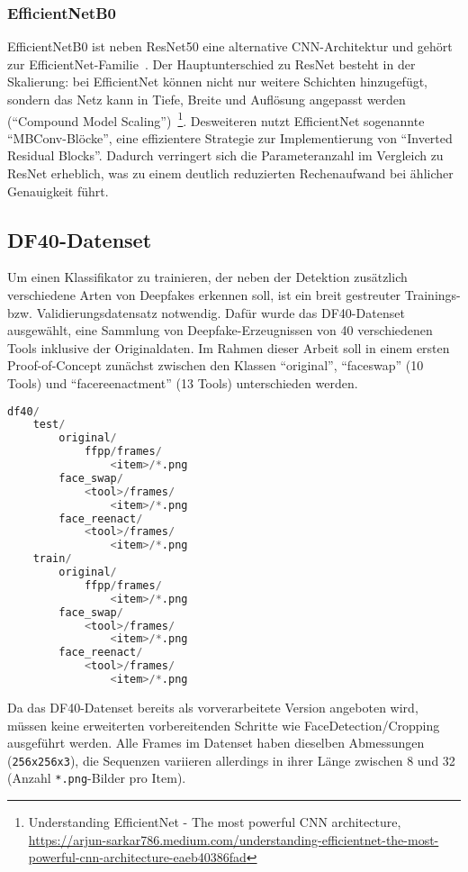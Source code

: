 \documentclass{article}
\begin{document}
    \subsubsection{EfficientNetB0}
    EfficientNetB0 ist neben ResNet50 eine alternative CNN-Architektur und gehört zur EfficientNet-Familie~\cite{efficientnet}.
    Der Hauptunterschied zu ResNet besteht in der Skalierung: bei EfficientNet können nicht nur weitere Schichten hinzugefügt, sondern das Netz kann in Tiefe, Breite und Auflösung angepasst werden (\enquote{Compound Model Scaling})~\footnote{Understanding EfficientNet - The most powerful CNN architecture, \url{https://arjun-sarkar786.medium.com/understanding-efficientnet-the-most-powerful-cnn-architecture-eaeb40386fad}}.
    Desweiteren nutzt EfficientNet sogenannte \enquote{MBConv-Blöcke}, eine effizientere Strategie zur Implementierung von \enquote{Inverted Residual Blocks}.
    Dadurch verringert sich die Parameteranzahl im Vergleich zu ResNet erheblich, was zu einem deutlich reduzierten Rechenaufwand bei ählicher Genauigkeit führt.
    \subsection{DF40-Datenset}
    Um einen Klassifikator zu trainieren, der neben der Detektion zusätzlich verschiedene Arten von Deepfakes erkennen soll, ist ein breit gestreuter Trainings- bzw. Validierungsdatensatz notwendig.
    Dafür wurde das DF40-Datenset~\cite{yan2024df40} ausgewählt, eine Sammlung von Deepfake-Erzeugnissen von 40 verschiedenen Tools inklusive der Originaldaten.
    Im Rahmen dieser Arbeit soll in einem ersten Proof-of-Concept zunächst zwischen den Klassen \enquote{original}, \enquote{faceswap} (10 Tools) und \enquote{facereenactment} (13 Tools) unterschieden werden.
    \begin{lstlisting}[language=Python,caption={Ordnerstruktur des DF40-Datensets im \enquote{io}-Verzeichnis}]
df40/
    test/
        original/
            ffpp/frames/
                <item>/*.png
        face_swap/
            <tool>/frames/
                <item>/*.png
        face_reenact/
            <tool>/frames/
                <item>/*.png
    train/
        original/
            ffpp/frames/
                <item>/*.png
        face_swap/
            <tool>/frames/
                <item>/*.png
        face_reenact/
            <tool>/frames/
                <item>/*.png
    \end{lstlisting}
    Da das DF40-Datenset bereits als vorverarbeitete Version angeboten wird, müssen keine erweiterten vorbereitenden Schritte wie FaceDetection/Cropping ausgeführt werden.
    Alle Frames im Datenset haben dieselben Abmessungen (\texttt{256x256x3}), die Sequenzen variieren allerdings in ihrer Länge zwischen 8 und 32 (Anzahl \texttt{*.png}-Bilder pro Item).
\end{document}
